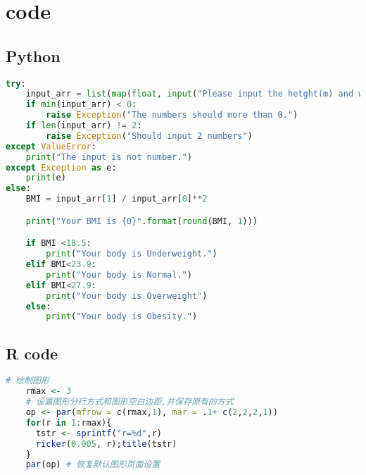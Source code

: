 \documentclass{xjtureport}
\begin{document}
 

\section{code}

\subsection{Python}

\begin{lstlisting}[language=Python]
    try:
    input_arr = list(map(float, input("Please input the hetght(m) and weight(kg) number:").split()))
    if min(input_arr) < 0:
        raise Exception("The numbers should more than 0.")
    if len(input_arr) != 2:
        raise Exception("Should input 2 numbers")
except ValueError:
    print("The input is not number.")
except Exception as e:
    print(e)
else:
    BMI = input_arr[1] / input_arr[0]**2

    print("Your BMI is {0}".format(round(BMI, 1)))

    if BMI <18.5:
        print("Your body is Underweight.")
    elif BMI<23.9:
        print("Your body is Normal.")
    elif BMI<27.9:
        print("Your body is Overweight")
    else:
        print("Your body is Obesity.")

\end{lstlisting}

\subsection{R code}

\begin{lstlisting}[language=R]
    # 绘制图形
    rmax <- 3
    # 设置图形分行方式和图形空白边距,并保存原有的方式
    op <- par(mfrow = c(rmax,1), mar = .1+ c(2,2,2,1))
    for(r in 1:rmax){
      tstr <- sprintf("r=%d",r)
      ricker(0.005, r);title(tstr)
    }
    par(op) # 恢复默认图形页面设置
\end{lstlisting}
\end{document}
